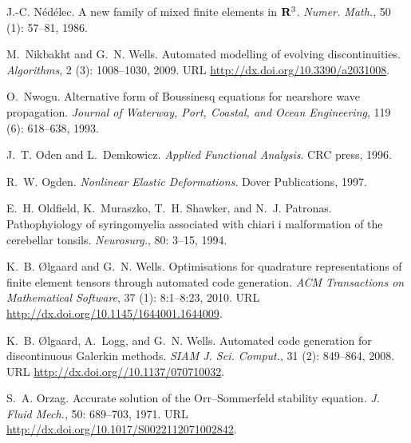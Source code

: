 \begin{thebibliography}{467}
J.-C. N{\'e}d{\'e}lec.
\newblock A new family of mixed finite elements in {${\bf R}\sp 3$}.
\newblock \emph{Numer. Math.}, 50 (1): 57--81, 1986.

M.~Nikbakht and G.~N. Wells.
\newblock Automated modelling of evolving discontinuities.
\newblock \emph{Algorithms}, 2 (3): 1008--1030, 2009.
\newblock URL \url{http://dx.doi.org/10.3390/a2031008}.

O.~Nwogu.
\newblock Alternative form of {B}oussinesq equations for nearshore wave
  propagation.
\newblock \emph{Journal of Waterway, Port, Coastal, and Ocean Engineering},
  119 (6): 618--638, 1993.

J.~T. Oden and L.~Demkowicz.
\newblock \emph{Applied Functional Analysis}.
\newblock CRC press, 1996.

R.~W. Ogden.
\newblock \emph{Nonlinear Elastic Deformations}.
\newblock Dover Publications, 1997.

E.~H. Oldfield, K.~Muraszko, T.~H. Shawker, and N.~J. Patronas.
\newblock Pathophyiology of syringomyelia associated with chiari i malformation
  of the cerebellar tonsils.
\newblock \emph{Neurosurg.}, 80: 3--15, 1994.

K.~B. \O{}lgaard and G.~N. Wells.
\newblock Optimisations for quadrature representations of finite element
  tensors through automated code generation.
\newblock \emph{ACM Transactions on Mathematical Software}, 37
  (1): 8:1--8:23, 2010.
\newblock URL \url{http://dx.doi.org/10.1145/1644001.1644009}.

K.~B. {\O}lgaard, A.~Logg, and G.~N. Wells.
\newblock Automated code generation for discontinuous {G}alerkin methods.
\newblock \emph{SIAM J. Sci. Comput.}, 31 (2): 849--864,
  2008.
\newblock URL \url{http://dx.doi.org//10.1137/070710032}.

S.~A. Orzag.
\newblock Accurate solution of the {O}rr--{S}ommerfeld stability equation.
\newblock \emph{J. Fluid Mech.}, 50: 689--703, 1971.
\newblock URL \url{http://dx.doi.org/10.1017/S0022112071002842}.


\end{thebibliography}
